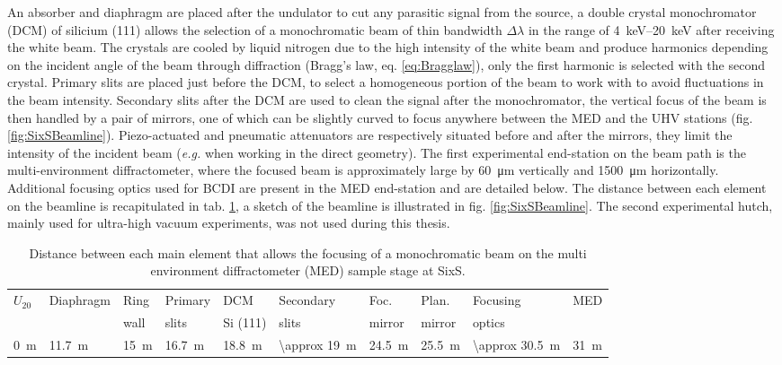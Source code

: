 An absorber and diaphragm are placed after the undulator to cut any parasitic signal from the source, a double crystal monochromator (DCM) of silicium (111) allows the selection of a monochromatic beam of thin bandwidth $\Delta \lambda$ in the range of \qtyrange{4}{20}{\keV} after receiving the white beam.
The crystals are cooled by liquid nitrogen due to the high intensity of the white beam and produce harmonics depending on the incident angle of the beam through diffraction (Bragg's law, eq. \ref{eq:Bragglaw}), only the first harmonic is selected with the second crystal.
Primary slits are placed just before the DCM, to select a homogeneous portion of the beam to work with to avoid fluctuations in the beam intensity.
Secondary slits after the DCM are used to clean the signal after the monochromator, the vertical focus of the beam is then handled by a pair of mirrors, one of which can be slightly curved to focus anywhere between the MED and the UHV stations (fig. \ref{fig:SixSBeamline}).
Piezo-actuated and pneumatic attenuators are respectively situated before and after the mirrors, they limit the intensity of the incident beam (\textit{e.g.} when working in the direct geometry).
The first experimental end-station on the beam path is the multi-environment diffractometer, where the focused beam is approximately large by \qty{60}{\um} vertically and \qty{1500}{\um} horizontally.
Additional focusing optics used for BCDI are present in the MED end-station and are detailed below.
The distance between each element on the beamline is recapitulated in tab. \ref{tab:DistanceSixS}, a sketch of the beamline is illustrated in fig. \ref{fig:SixSBeamline}.
The second experimental hutch, mainly used for ultra-high vacuum experiments, was not used during this thesis.

\begin{table}[!htb]
	\centering
    \small{
	\begin{tabular}{@{}llllllllll@{}}
	\toprule
	$U_{20}$ & Diaphragm & Ring    & Primary     & DCM         & Secondary       & Foc.      & Plan.     & Focusing &  MED \\
	         &           & wall    & slits       & Si (111)    & slits           & mirror    & mirror    & optics        &  \\
 	\midrule
 	\qty{0}{\m}&\qty{11.7}{\m}&\qty{15}{\m}&\qty{16.7}{\m}&\qty{18.8}{\m}&\qty{\approx 19}{\m}&\qty{24.5}{\m}&\qty{25.5}{\m}&\qty{\approx 30.5}{\m}&\qty{31}{\m}
	\end{tabular}
    }
	\caption{
		Distance between each main element that allows the focusing of a monochromatic beam on the multi environment diffractometer (MED) sample stage at SixS.
	}
    \label{tab:DistanceSixS}
\end{table}

